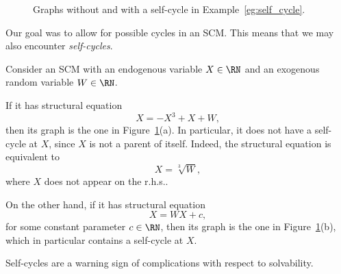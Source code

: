 \begin{figure}
  \begin{center}\end{center}
  \caption{Graphs without and with a self-cycle in Example~\ref{eg:self_cycle}.\label{fig:eg:self_cycle}}
\end{figure}
Our goal was to allow for possible cycles in an SCM. This means that we may also encounter \emph{self-cycles}.
\begin{Eg}\label{eg:self_cycle}
  Consider an SCM with an endogenous variable $X \in \RN$ and an exogenous random variable $W \in \RN$.

  If it has structural equation
  $$X = -X^3 + X + W,$$
  then its graph is the one in Figure~\ref{fig:eg:self_cycle}(a).
  In particular, it does not have a self-cycle at $X$, since $X$ is not a parent of itself. 
  Indeed, the structural equation is equivalent to 
  $$X = \sqrt[3]{W},$$
  where $X$ does not appear on the r.h.s..
  
  On the other hand, if it has structural equation
  $$X = W X + c,$$
  for some constant parameter $c \in \RN$,
  then its graph is the one in Figure~\ref{fig:eg:self_cycle}(b), which in particular contains a self-cycle at $X$.
\end{Eg}
Self-cycles are a warning sign of complications with respect to solvability.

